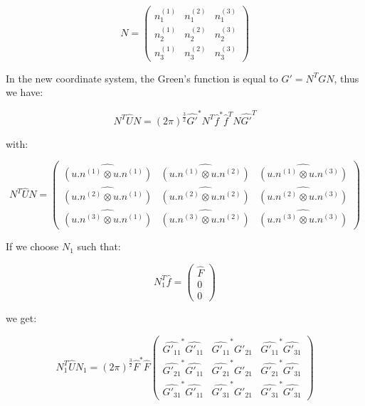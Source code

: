 \documentclass[workdone.tex]{subfiles}
\begin{document}
\begin{equation}
N = \begin{pmatrix}
n_1^{(1)} & n_1^{(2)} & n_1^{(3)} \\
n_2^{(1)} & n_2^{(2)} & n_2^{(3)} \\
n_3^{(1)} & n_3^{(2)} & n_3^{(3)}
\end{pmatrix}
\end{equation}

In the new coordinate system, the Green's function is equal to $G' = N^T G N$, thus we have:

\begin{equation}
N^T \hat{U} N = (2 \pi)^{\frac{3}{2}} \hat{G'}^* N^T \hat{f}^* \hat{f}^T N \hat{G'}^T
\end{equation}

with:

\begin{equation}
N^T \hat{U} N = \begin{pmatrix}
\hat{(u . n^{(1)} \otimes u . n^{(1)})} & \hat{(u . n^{(1)} \otimes u . n^{(2)})} & \hat{(u . n^{(1)} \otimes u . n^{(3)})} \\
\hat{(u . n^{(2)} \otimes u . n^{(1)})} & \hat{(u . n^{(2)} \otimes u . n^{(2)})} & \hat{(u . n^{(2)} \otimes u . n^{(3)})} \\
\hat{(u . n^{(3)} \otimes u . n^{(1)})} & \hat{(u . n^{(3)} \otimes u . n^{(2)})} & \hat{(u . n^{(3)} \otimes u . n^{(3)})}
\end{pmatrix}
\end{equation}

If we choose $N_1$ such that:

\begin{equation}
N_1^T \hat{f} = \begin{pmatrix}
\hat{F} \\
0 \\
0
\end{pmatrix}
\end{equation}

we get:

\begin{equation}
N_1^T \hat{U} N_1 = (2 \pi)^{\frac{3}{2}} \hat{F}^* \hat{F} \begin{pmatrix}
\hat{G'_{11}}^* \hat{G'_{11}} & \hat{G'_{11}}^* \hat{G'_{21}} & \hat{G'_{11}}^* \hat{G'_{31}} \\
\hat{G'_{21}}^* \hat{G'_{11}} & \hat{G'_{21}}^* \hat{G'_{21}} & \hat{G'_{21}}^* \hat{G'_{31}} \\
\hat{G'_{31}}^* \hat{G'_{11}} & \hat{G'_{31}}^* \hat{G'_{21}} & \hat{G'_{31}}^* \hat{G'_{31}}
\end{pmatrix}
\end{equation}
\end{document}
